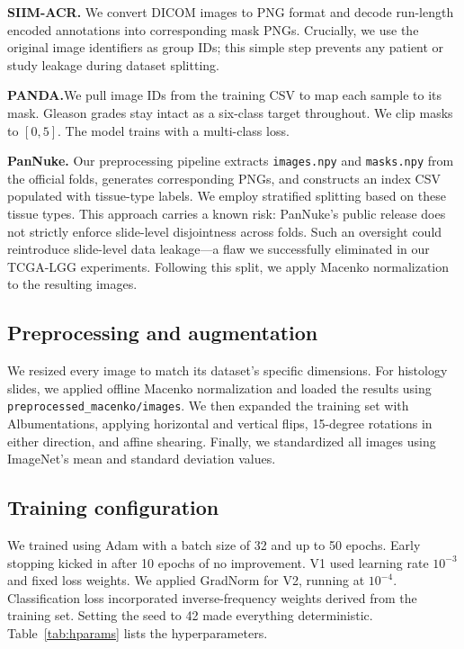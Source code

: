 \documentclass[conference,a4paper]{IEEEtran}
\begin{document}
\textbf{SIIM-ACR.} We convert DICOM images to PNG format and decode run-length encoded annotations into corresponding mask PNGs. Crucially, we use the original image identifiers as group IDs; this simple step prevents any patient or study leakage during dataset splitting.

\textbf{PANDA.}We pull image IDs from the training CSV to map each sample to its mask. Gleason grades stay intact as a six-class target throughout. We clip masks to $[0,5]$. The model trains with a multi-class loss.

\textbf{PanNuke.} Our preprocessing pipeline extracts \texttt{images.npy} and \texttt{masks.npy} from the official folds, generates corresponding PNGs, and constructs an index CSV populated with tissue-type labels. We employ stratified splitting based on these tissue types. This approach carries a known risk: PanNuke's public release does not strictly enforce slide-level disjointness across folds. Such an oversight could reintroduce slide-level data leakage—a flaw we successfully eliminated in our TCGA-LGG experiments. Following this split, we apply Macenko normalization to the resulting images.

\subsection{Preprocessing and augmentation}
We resized every image to match its dataset’s specific dimensions. For histology slides, we applied offline Macenko normalization and loaded the results using \texttt{preprocessed\_macenko/images}. We then expanded the training set with Albumentations, applying horizontal and vertical flips, 15-degree rotations in either direction, and affine shearing. Finally, we standardized all images using ImageNet’s mean and standard deviation values.

\subsection{Training configuration}
We trained using Adam with a batch size of 32 and up to 50 epochs. Early stopping kicked in after 10 epochs of no improvement. V1 used learning rate $10^{-3}$ and fixed loss weights. We applied GradNorm for V2, running at $10^{-4}$. Classification loss incorporated inverse-frequency weights derived from the training set. Setting the seed to 42 made everything deterministic. Table~\ref{tab:hparams} lists the hyperparameters.
\end{document}
